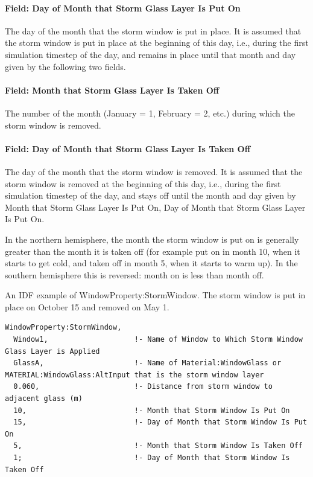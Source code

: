 \paragraph{Field: Day of Month that Storm Glass Layer Is Put On}\label{field-day-of-month-that-storm-glass-layer-is-put-on}

The day of the month that the storm window is put in place. It is assumed that the storm window is put in place at the beginning of this day, i.e., during the first simulation timestep of the day, and remains in place until that month and day given by the following two fields.

\paragraph{Field: Month that Storm Glass Layer Is Taken Off}\label{field-month-that-storm-glass-layer-is-taken-off}

The number of the month (January = 1, February = 2, etc.) during which the storm window is removed.

\paragraph{Field: Day of Month that Storm Glass Layer Is Taken Off}\label{field-day-of-month-that-storm-glass-layer-is-taken-off}

The day of the month that the storm window is removed. It is assumed that the storm window is removed at the beginning of this day, i.e., during the first simulation timestep of the day, and stays off until the month and day given by Month that Storm Glass Layer Is Put On, Day of Month that Storm Glass Layer Is Put On.

In the northern hemisphere, the month the storm window is put on is generally greater than the month it is taken off (for example put on in month 10, when it starts to get cold, and taken off in month 5, when it starts to warm up). In the southern hemisphere this is reversed: month on is less than month off.

An IDF example of WindowProperty:StormWindow. The storm window is put in place on October 15 and removed on May 1.

\begin{lstlisting}
WindowProperty:StormWindow,
  Window1,                    !- Name of Window to Which Storm Window Glass Layer is Applied
  GlassA,                     !- Name of Material:WindowGlass or MATERIAL:WindowGlass:AltInput that is the storm window layer
  0.060,                      !- Distance from storm window to adjacent glass (m)
  10,                         !- Month that Storm Window Is Put On
  15,                         !- Day of Month that Storm Window Is Put On
  5,                          !- Month that Storm Window Is Taken Off
  1;                          !- Day of Month that Storm Window Is Taken Off
\end{lstlisting}

